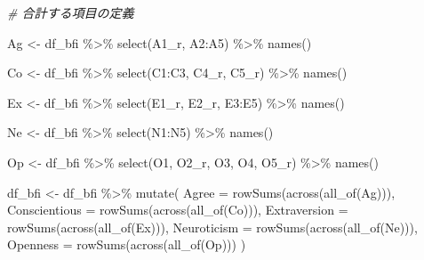\documentclass[
  xelatex,ja=standard, b5paper]{bxjsbook}
\newenvironment{Shaded}{\begin{snugshade}}{\end{snugshade}}
\newcommand{\AttributeTok}[1]{\textcolor[rgb]{0.77,0.63,0.00}{#1}}
\newcommand{\CommentTok}[1]{\textcolor[rgb]{0.56,0.35,0.01}{\textit{#1}}}
\newcommand{\FunctionTok}[1]{\textcolor[rgb]{0.00,0.00,0.00}{#1}}
\newcommand{\NormalTok}[1]{#1}
\newcommand{\OtherTok}[1]{\textcolor[rgb]{0.56,0.35,0.01}{#1}}
\newcommand{\SpecialCharTok}[1]{\textcolor[rgb]{0.00,0.00,0.00}{#1}}
\begin{document}
\begin{Shaded}
\begin{Highlighting}[]
\CommentTok{\# 合計する項目の定義}

\NormalTok{Ag }\OtherTok{\textless{}{-}} 
\NormalTok{df\_bfi }\SpecialCharTok{\%\textgreater{}\%} 
  \FunctionTok{select}\NormalTok{(A1\_r, A2}\SpecialCharTok{:}\NormalTok{A5) }\SpecialCharTok{\%\textgreater{}\%} 
  \FunctionTok{names}\NormalTok{()}

\NormalTok{Co }\OtherTok{\textless{}{-}} 
\NormalTok{df\_bfi }\SpecialCharTok{\%\textgreater{}\%} 
  \FunctionTok{select}\NormalTok{(C1}\SpecialCharTok{:}\NormalTok{C3, C4\_r, C5\_r) }\SpecialCharTok{\%\textgreater{}\%} 
  \FunctionTok{names}\NormalTok{()}

\NormalTok{Ex }\OtherTok{\textless{}{-}} 
\NormalTok{  df\_bfi }\SpecialCharTok{\%\textgreater{}\%} 
  \FunctionTok{select}\NormalTok{(E1\_r, E2\_r, E3}\SpecialCharTok{:}\NormalTok{E5) }\SpecialCharTok{\%\textgreater{}\%} 
  \FunctionTok{names}\NormalTok{()}

\NormalTok{Ne }\OtherTok{\textless{}{-}} 
\NormalTok{df\_bfi }\SpecialCharTok{\%\textgreater{}\%} 
  \FunctionTok{select}\NormalTok{(N1}\SpecialCharTok{:}\NormalTok{N5) }\SpecialCharTok{\%\textgreater{}\%} 
  \FunctionTok{names}\NormalTok{()}

\NormalTok{Op }\OtherTok{\textless{}{-}} 
\NormalTok{df\_bfi }\SpecialCharTok{\%\textgreater{}\%} 
  \FunctionTok{select}\NormalTok{(O1, O2\_r, O3, O4, O5\_r) }\SpecialCharTok{\%\textgreater{}\%} 
  \FunctionTok{names}\NormalTok{()}


\NormalTok{df\_bfi }\OtherTok{\textless{}{-}} 
\NormalTok{  df\_bfi }\SpecialCharTok{\%\textgreater{}\%} 
  \FunctionTok{mutate}\NormalTok{(}
    \AttributeTok{Agree         =} \FunctionTok{rowSums}\NormalTok{(}\FunctionTok{across}\NormalTok{(}\FunctionTok{all\_of}\NormalTok{(Ag))),}
    \AttributeTok{Conscientious =} \FunctionTok{rowSums}\NormalTok{(}\FunctionTok{across}\NormalTok{(}\FunctionTok{all\_of}\NormalTok{(Co))),}
    \AttributeTok{Extraversion  =} \FunctionTok{rowSums}\NormalTok{(}\FunctionTok{across}\NormalTok{(}\FunctionTok{all\_of}\NormalTok{(Ex))),}
    \AttributeTok{Neuroticism   =} \FunctionTok{rowSums}\NormalTok{(}\FunctionTok{across}\NormalTok{(}\FunctionTok{all\_of}\NormalTok{(Ne))),}
    \AttributeTok{Openness      =} \FunctionTok{rowSums}\NormalTok{(}\FunctionTok{across}\NormalTok{(}\FunctionTok{all\_of}\NormalTok{(Op)))}
\NormalTok{    )}
\end{Highlighting}
\end{Shaded}
\end{document}
